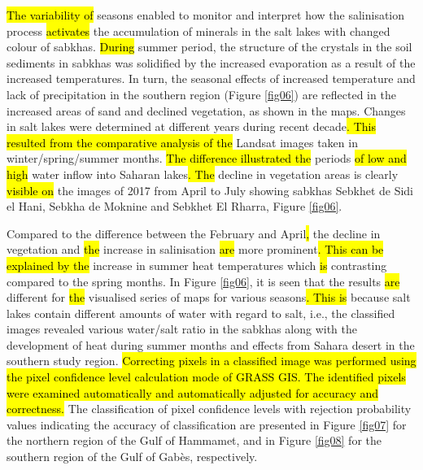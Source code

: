 \documentclass[land,article,submit,pdftex,moreauthors]{Definitions/mdpi}
\begin{document}
\hl{The variability of} seasons enabled to monitor and interpret how the salinisation process \hl{activates} the accumulation of minerals in the salt lakes with changed colour of sabkhas. \hl{During }summer period, the structure of the crystals in the soil sediments in sabkhas was solidified by the increased evaporation as a result of the increased temperatures. In turn, the seasonal effects of increased temperature and lack of precipitation in the southern region (Figure \ref{fig06}) are reflected in the increased areas of sand and declined vegetation, as shown in the maps. Changes in salt lakes were determined at different years during recent decade\hl{. This resulted from the comparative analysis of the }Landsat images taken in winter/spring/summer months. \hl{The difference illustrated the} periods \hl{of low and high }water inflow into Saharan lakes\hl{. The} decline in vegetation areas is clearly \hl{visible on} the images of 2017 from April to July showing sabkhas Sebkhet de Sidi el Hani, Sebkha de Moknine  and Sebkhet El Rharra, Figure \ref{fig06}. 

Compared to the difference between the February and April\hl{, }the decline in vegetation and \hl{the }increase in salinisation \hl{are} more prominent\hl{. This can be explained by the }increase in summer heat temperatures which \hl{is} contrasting compared to the spring months. In Figure \ref{fig06}, it is seen that the results \hl{are }different for \hl{the }visualised series of maps for various seasons\hl{. This is }because salt lakes contain different amounts of water with regard to salt, i.e., the classified images revealed various water/salt ratio in the sabkhas along with the development of heat during summer months and effects from Sahara desert in the southern study region. \hl{Correcting pixels in a classified image was performed using the pixel confidence level calculation mode of GRASS GIS. The identified pixels were examined automatically and automatically adjusted for accuracy and correctness. }The classification of pixel confidence levels with rejection probability values indicating the accuracy of classification are presented in Figure \ref{fig07} for the northern region of the Gulf of Hammamet, and in Figure \ref{fig08} for the southern region of the Gulf of Gabès, respectively. 
\end{document}
